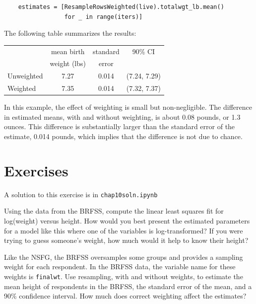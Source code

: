 \documentclass[12pt]{book}
\begin{document}
\begin{verbatim}
    estimates = [ResampleRowsWeighted(live).totalwgt_lb.mean()
                 for _ in range(iters)]
\end{verbatim}

The following table summarizes the results:

\begin{center}
\begin{tabular}{|l|c|c|c|}
\hline
                    &  mean birth   & standard  &  90\% CI  \\ 
                    &  weight (lbs) & error     &           \\ 
\hline
Unweighted          &  7.27  &  0.014  &  (7.24, 7.29)  \\ 
Weighted            &  7.35  &  0.014  &  (7.32, 7.37)  \\ 
\hline
\end{tabular}
\end{center}


In this example, the effect of weighting is small but non-negligible.
The difference in estimated means, with and without weighting, is
about 0.08 pounds, or 1.3 ounces.  This difference is substantially
larger than the standard error of the estimate, 0.014 pounds, which
implies that the difference is not due to chance.


\section{Exercises}

A solution to this exercise is in \verb"chap10soln.ipynb"

\begin{exercise}

Using the data from the BRFSS, compute the linear least squares
fit for log(weight) versus height.
How would you best present the estimated parameters for a model
like this where one of the variables is log-transformed?
If you were trying to guess
someone's weight, how much would it help to know their height?

Like the NSFG, the BRFSS oversamples some groups and provides
a sampling weight for each respondent.  In the BRFSS data, the variable
name for these weights is {\tt finalwt}.
Use resampling, with and without weights, to estimate the mean height
of respondents in the BRFSS, the standard error of the mean, and a
90\% confidence interval.  How much does correct weighting affect the
estimates?
\end{exercise}
\end{document}
